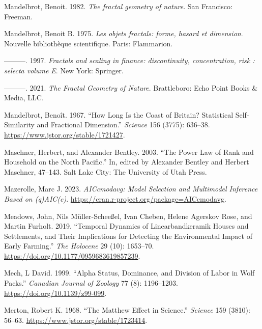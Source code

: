 \documentclass[
  12pt,
  a4paper, twoside]{book}
\newlength{\cslhangindent}
\newlength{\cslentryspacingunit} %
\newenvironment{CSLReferences}[2] %
 {%
  \setlength{\parindent}{0pt}
  \ifodd #1
  \let\oldpar\par
  \def\par{\hangindent=\cslhangindent\oldpar}
  \fi
  \setlength{\parskip}{#2\cslentryspacingunit}
 }%
 {}
\begin{document}
\begin{CSLReferences}{1}{0}
\leavevmode{}%
Mandelbrot, Benoit. 1982. \emph{The fractal geometry of nature}. San Francisco: Freeman.

\leavevmode{}%
Mandelbrot, Benoit B. 1975. \emph{Les objets fractals: forme, hasard et dimension}. Nouvelle bibliothèque scientifique. Paris: Flammarion.

\leavevmode{}%
---------. 1997. \emph{Fractals and scaling in finance: discontinuity, concentration, risk : selecta volume E}. New York: Springer.

\leavevmode{}%
---------. 2021. \emph{The Fractal Geometry of Nature}. Brattleboro: Echo Point Books \& Media, LLC.

\leavevmode{}%
Mandelbrot, Benoît. 1967. {``How Long Is the Coast of Britain? Statistical Self-Similarity and Fractional Dimension.''} \emph{Science} 156 (3775): 636--38. \url{https://www.jstor.org/stable/1721427}.

\leavevmode{}%
Maschner, Herbert, and Alexander Bentley. 2003. {``The Power Law of Rank and Household on the North Pacific.''} In, edited by Alexander Bentley and Herbert Maschner, 47--143. Salt Lake City: The University of Utah Press.

\leavevmode{}%
Mazerolle, Marc J. 2023. \emph{AICcmodavg: Model Selection and Multimodel Inference Based on (q)AIC(c)}. \url{https://cran.r-project.org/package=AICcmodavg}.

\leavevmode{}%
Meadows, John, Nils Müller-Scheeßel, Ivan Cheben, Helene Agerskov Rose, and Martin Furholt. 2019. {``Temporal Dynamics of Linearbandkeramik Houses and Settlements, and Their Implications for Detecting the Environmental Impact of Early Farming.''} \emph{The Holocene} 29 (10): 1653--70. \url{https://doi.org/10.1177/0959683619857239}.

\leavevmode{}%
Mech, L David. 1999. {``Alpha Status, Dominance, and Division of Labor in Wolf Packs.''} \emph{Canadian Journal of Zoology} 77 (8): 1196--1203. \url{https://doi.org/10.1139/z99-099}.

\leavevmode{}%
Merton, Robert K. 1968. {``The Matthew Effect in Science.''} \emph{Science} 159 (3810): 56--63. \url{https://www.jstor.org/stable/1723414}.


\end{CSLReferences}
\end{document}
